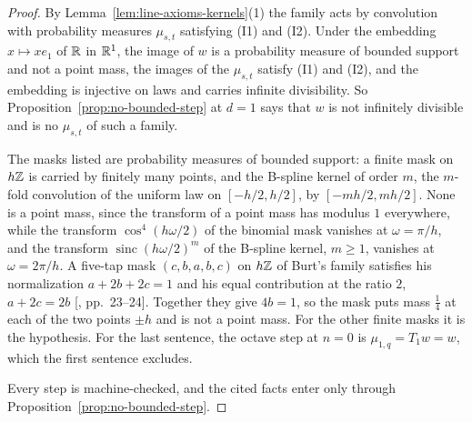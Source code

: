 \begin{proof}
\leanok
{}
By Lemma~\ref{lem:line-axioms-kernels}(1) the family acts by convolution with probability
measures $\mu_{s,t}$ satisfying (I1) and (I2). Under the embedding $x \mapsto xe_1$ of $\mathbb{R}$ in
$\mathbb{R}^1$, the image of $w$ is a probability measure of bounded support and not a point mass, the
images of the $\mu_{s,t}$ satisfy (I1) and (I2), and the embedding is injective on laws and
carries infinite divisibility. So Proposition~\ref{prop:no-bounded-step} at $d = 1$ says that
$w$ is not infinitely divisible and is no $\mu_{s,t}$ of such a family.

The masks listed are probability measures of bounded support: a finite mask on $h\mathbb{Z}$ is carried
by finitely many points, and the B-spline kernel of order $m$, the $m$-fold convolution of the
uniform law on $[-h/2, h/2]$, by $[-mh/2, mh/2]$. None is a point mass, since the transform of a
point mass has modulus $1$ everywhere, while the transform $\cos^4(h\omega/2)$ of the binomial
mask vanishes at $\omega = \pi/h$, and the transform $\operatorname{sinc}(h\omega/2)^m$ of the
B-spline kernel, $m \ge 1$, vanishes at $\omega = 2\pi/h$.
A five-tap mask $(c, b, a, b, c)$ on $h\mathbb{Z}$ of Burt's family satisfies his normalization
$a + 2b + 2c = 1$ and his equal contribution at the ratio $2$, $a + 2c = 2b$
[, pp.~23--24]. Together they give $4b = 1$, so the mask puts mass
$\tfrac14$ at each of the two points $\pm h$ and is not a point mass. For the other finite
masks it is the hypothesis. For the last sentence, the octave step at $n = 0$ is $\mu_{1,q} = T_1w = w$, which the
first sentence excludes.

Every step is machine-checked, and the cited facts enter only through
Proposition~\ref{prop:no-bounded-step}.
\end{proof}

